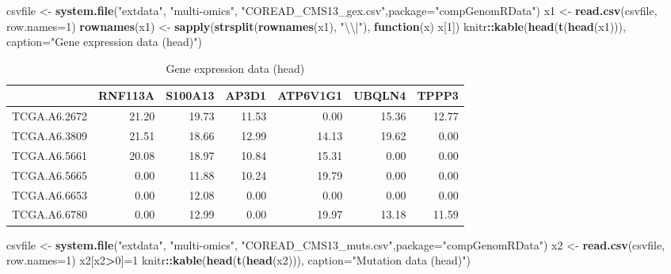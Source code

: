 \documentclass[12pt,]{krantz}
\newenvironment{Shaded}{\begin{snugshade}}{\end{snugshade}}
\newcommand{\CharTok}[1]{\textcolor[rgb]{0.31,0.60,0.02}{#1}}
\newcommand{\ControlFlowTok}[1]{\textcolor[rgb]{0.13,0.29,0.53}{\textbf{#1}}}
\newcommand{\DataTypeTok}[1]{\textcolor[rgb]{0.13,0.29,0.53}{#1}}
\newcommand{\DecValTok}[1]{\textcolor[rgb]{0.00,0.00,0.81}{#1}}
\newcommand{\KeywordTok}[1]{\textcolor[rgb]{0.13,0.29,0.53}{\textbf{#1}}}
\newcommand{\NormalTok}[1]{#1}
\newcommand{\OperatorTok}[1]{\textcolor[rgb]{0.81,0.36,0.00}{\textbf{#1}}}
\newcommand{\StringTok}[1]{\textcolor[rgb]{0.31,0.60,0.02}{#1}}
\begin{document}
\begin{Shaded}
\begin{Highlighting}[]
\NormalTok{csvfile <-}\StringTok{ }\KeywordTok{system.file}\NormalTok{(}\StringTok{"extdata"}\NormalTok{, }\StringTok{"multi-omics"}\NormalTok{, }\StringTok{"COREAD_CMS13_gex.csv"}\NormalTok{,}\DataTypeTok{package=}\StringTok{"compGenomRData"}\NormalTok{)}
\NormalTok{x1 <-}\StringTok{ }\KeywordTok{read.csv}\NormalTok{(csvfile, }\DataTypeTok{row.names=}\DecValTok{1}\NormalTok{)}
\KeywordTok{rownames}\NormalTok{(x1) <-}\StringTok{ }\KeywordTok{sapply}\NormalTok{(}\KeywordTok{strsplit}\NormalTok{(}\KeywordTok{rownames}\NormalTok{(x1), }\StringTok{"}\CharTok{\textbackslash{}\textbackslash{}}\StringTok{|"}\NormalTok{), }\ControlFlowTok{function}\NormalTok{(x) x[}\DecValTok{1}\NormalTok{])}
\NormalTok{knitr}\OperatorTok{::}\KeywordTok{kable}\NormalTok{(}\KeywordTok{head}\NormalTok{(}\KeywordTok{t}\NormalTok{(}\KeywordTok{head}\NormalTok{(x1))), }\DataTypeTok{caption=}\StringTok{"Gene expression data (head)"}\NormalTok{)}
\end{Highlighting}
\end{Shaded}

\begin{table}[t]

\caption{\label{tab:moloadMultiomicsGE}Gene expression data (head)}
\centering
\begin{tabular}{l|r|r|r|r|r|r}
\hline
  & RNF113A & S100A13 & AP3D1 & ATP6V1G1 & UBQLN4 & TPPP3\\
\hline
TCGA.A6.2672 & 21.20 & 19.73 & 11.53 & 0.00 & 15.36 & 12.77\\
\hline
TCGA.A6.3809 & 21.51 & 18.66 & 12.99 & 14.13 & 19.62 & 0.00\\
\hline
TCGA.A6.5661 & 20.08 & 18.97 & 10.84 & 15.31 & 0.00 & 0.00\\
\hline
TCGA.A6.5665 & 0.00 & 11.88 & 10.24 & 19.79 & 0.00 & 0.00\\
\hline
TCGA.A6.6653 & 0.00 & 12.08 & 0.00 & 0.00 & 0.00 & 0.00\\
\hline
TCGA.A6.6780 & 0.00 & 12.99 & 0.00 & 19.97 & 13.18 & 11.59\\
\hline
\end{tabular}
\end{table}

\begin{Shaded}
\begin{Highlighting}[]
\NormalTok{csvfile <-}\StringTok{ }\KeywordTok{system.file}\NormalTok{(}\StringTok{"extdata"}\NormalTok{, }\StringTok{"multi-omics"}\NormalTok{, }\StringTok{"COREAD_CMS13_muts.csv"}\NormalTok{,}\DataTypeTok{package=}\StringTok{"compGenomRData"}\NormalTok{)}
\NormalTok{x2 <-}\StringTok{ }\KeywordTok{read.csv}\NormalTok{(csvfile, }\DataTypeTok{row.names=}\DecValTok{1}\NormalTok{)}
\NormalTok{x2[x2}\OperatorTok{>}\DecValTok{0}\NormalTok{]=}\DecValTok{1}
\NormalTok{knitr}\OperatorTok{::}\KeywordTok{kable}\NormalTok{(}\KeywordTok{head}\NormalTok{(}\KeywordTok{t}\NormalTok{(}\KeywordTok{head}\NormalTok{(x2))), }\DataTypeTok{caption=}\StringTok{"Mutation data (head)"}\NormalTok{)}
\end{Highlighting}
\end{Shaded}
\end{document}
